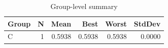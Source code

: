 \begin{table}[htbp]
\centering
\caption{Group-level summary}
\label{tab:group-summary}
\begin{tabular}{lrrrrr}
\toprule
\textbf{Group} & \textbf{N} & \textbf{Mean} & \textbf{Best} & \textbf{Worst} & \textbf{StdDev} \\
\midrule
C & 1 & 0.5938 & 0.5938 & 0.5938 & 0.0000 \\
\bottomrule
\end{tabular}
\end{table}